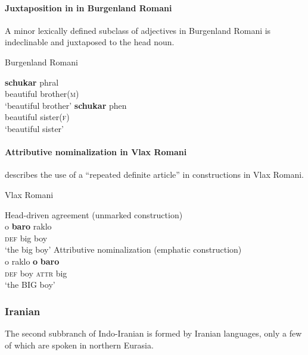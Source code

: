 \paragraph*{Juxtaposition in in Burgenland Romani}
A minor lexically defined subclass of adjectives in Burgenland Romani is indeclinable and juxtaposed to the head noun.
\begin{exe}
\ex \rm{Burgenland Romani \citep[22–23]{halwachs-etal2002}}
\begin{xlist}
\ex 
\gll	\textbf{schukar} phral\\
	beautiful brother(\textsc{m})\\
\glt	‘beautiful brother’
\ex
\gll	\textbf{schukar} phen\\
	beautiful sister(\textsc{f})\\
\glt	‘beautiful sister’
\end{xlist}
\end{exe}

\paragraph*{Attributive nominalization in Vlax Romani}
\citet{hancock1995} describes the use of a “repeated definite article” in  constructions in Vlax Romani. 
\begin{exe}
\ex \rm{Vlax Romani \citep[30]{hancock1995}}
\begin{xlist}
\ex \rm{Head\hyp{}driven agreement (unmarked construction)}\\
\gll	o \textbf{baro} raklo\\
	\textsc{def}	big	boy\\
\glt ‘the big boy’
\ex \rm{Attributive nominalization (emphatic construction)}\\
\gll	o raklo \textbf{o} \textbf{baro}\\
	\textsc{def}	{boy}	\textsc{attr} big\\
\glt	‘the BIG boy’
\end{xlist}
\end{exe}

\subsubsection{Iranian}\label{iranian synchr}
The second subbranch of Indo-Iranian is formed by Iranian languages, only a few of which are spoken in northern Eurasia.

